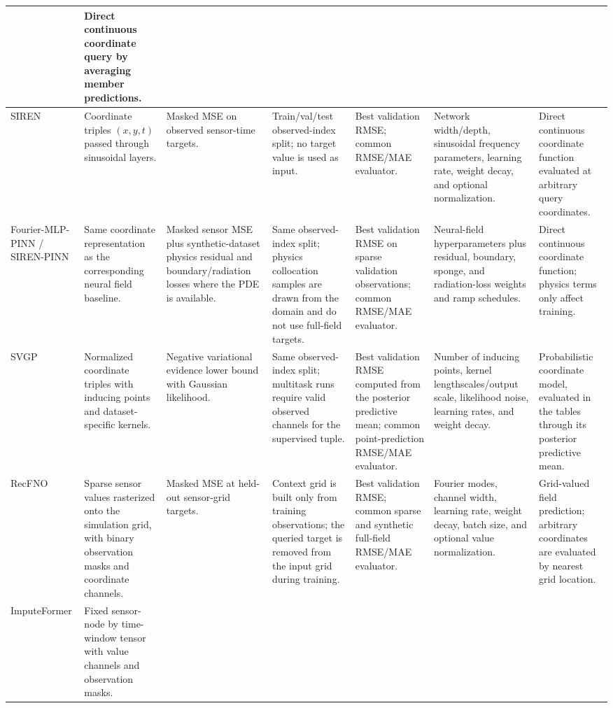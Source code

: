 \begin{table}[htbp]
{\begin{tabular}{p{}p{}p{}p{}p{}p{}p{}}
& Direct continuous coordinate query by averaging member predictions. \\
\midrule
SIREN
& Coordinate triples $(x,y,t)$ passed through sinusoidal layers.
& Masked MSE on observed sensor-time targets.
& Train/val/test observed-index split; no target value is used as input.
& Best validation RMSE; common RMSE/MAE evaluator.
& Network width/depth, sinusoidal frequency parameters, learning rate, weight decay, and optional normalization.
& Direct continuous coordinate function evaluated at arbitrary query coordinates. \\
\midrule
Fourier-MLP-PINN / SIREN-PINN
& Same coordinate representation as the corresponding neural field baseline.
& Masked sensor MSE plus synthetic-dataset physics residual and boundary/radiation losses where the PDE is available.
& Same observed-index split; physics collocation samples are drawn from the domain and do not use full-field targets.
& Best validation RMSE on sparse validation observations; common RMSE/MAE evaluator.
& Neural-field hyperparameters plus residual, boundary, sponge, and radiation-loss weights and ramp schedules.
& Direct continuous coordinate function; physics terms only affect training. \\
\midrule
SVGP
& Normalized coordinate triples with inducing points and dataset-specific kernels.
& Negative variational evidence lower bound with Gaussian likelihood.
& Same observed-index split; multitask runs require valid observed channels for the supervised tuple.
& Best validation RMSE computed from the posterior predictive mean; common point-prediction RMSE/MAE evaluator.
& Number of inducing points, kernel lengthscales/output scale, likelihood noise, learning rates, and weight decay.
& Probabilistic coordinate model, evaluated in the tables through its posterior predictive mean. \\
\midrule
RecFNO
& Sparse sensor values rasterized onto the simulation grid, with binary observation masks and coordinate channels.
& Masked MSE at held-out sensor-grid targets.
& Context grid is built only from training observations; the queried target is removed from the input grid during training.
& Best validation RMSE; common sparse and synthetic full-field RMSE/MAE evaluator.
& Fourier modes, channel width, learning rate, weight decay, batch size, and optional value normalization.
& Grid-valued field prediction; arbitrary coordinates are evaluated by nearest grid location. \\
\midrule
Impute\-Former
& Fixed sensor-node by time-window tensor with value channels and observation masks.

\end{tabular}}
\end{table}
